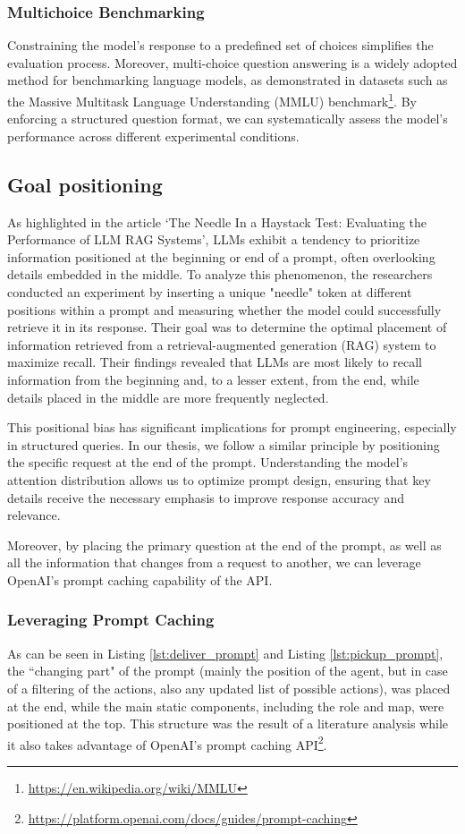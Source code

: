 \subsubsection{Multichoice Benchmarking}

Constraining the model's response to a predefined set of choices simplifies the
evaluation process. Moreover, multi-choice question answering is a widely
adopted method for benchmarking language models, as demonstrated in datasets such
as the Massive Multitask Language Understanding (MMLU) benchmark\footnote{\url{https://en.wikipedia.org/wiki/MMLU}}.
By enforcing a structured question format, we can systematically assess the
model's performance across different experimental conditions.

\subsection{Goal positioning}

As highlighted in the article `The Needle In a Haystack Test: Evaluating the Performance
of LLM RAG Systems'\cite{needleRAG}, LLMs exhibit a tendency to prioritize
information positioned at the beginning or end of a prompt, often overlooking details
embedded in the middle. To analyze this phenomenon, the researchers conducted an
experiment by inserting a unique "needle" token at different positions within a prompt
and measuring whether the model could successfully retrieve it in its response.
Their goal was to determine the optimal placement of information retrieved from
a retrieval-augmented generation (RAG) system to maximize recall. Their findings
revealed that LLMs are most likely to recall information from the beginning and,
to a lesser extent, from the end, while details placed in the middle are more
frequently neglected.

This positional bias has significant implications for prompt engineering, especially
in structured queries. In our thesis, we follow a similar principle by positioning
the specific request at the end of the prompt. Understanding the model's
attention distribution allows us to optimize prompt design, ensuring that key details
receive the necessary emphasis to improve response accuracy and relevance.

Moreover, by placing the primary question at the end of the prompt, as well as all
the information that changes from a request to another, we can leverage OpenAI's
prompt caching capability of the API.

\subsubsection{Leveraging Prompt Caching}
As can be seen in Listing \ref{lst:deliver_prompt} and Listing
\ref{lst:pickup_prompt}, the ``changing part" of the prompt (mainly the position
of the agent, but in case of a filtering of the actions, also any updated list of
possible actions), was placed at the end, while the main static components, including
the role and map, were positioned at the top. This structure was the result of a
literature analysis while it also takes advantage of OpenAI's prompt caching API\footnote{\url{https://platform.openai.com/docs/guides/prompt-caching}}.


